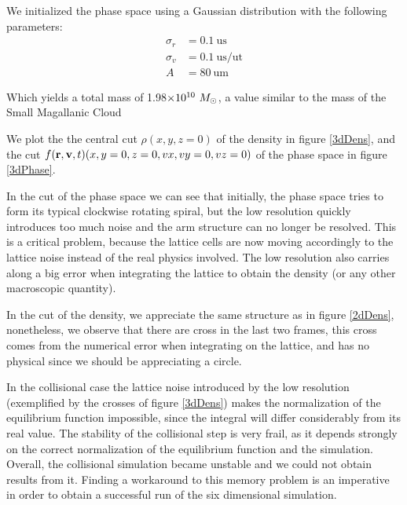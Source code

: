 {We initialized the phase space using a Gaussian distribution with the following parameters:
\begin{align}
\sigma_r &= 0.1 \ \text{us} \\
\sigma_v &= 0.1 \ \text{us} / \text{ut} \\
A &= 80  \ \text{um}
\end{align}

Which yields a total mass of 1.98$\e{10} \ M_{\odot}$, a value similar to the mass of the Small Magallanic Cloud \cite{2009MNRAS395342B}

We plot the the central cut $\rho(x,y,z=0)$ of the density in figure \ref{3dDens}, and the cut $\f(x,y=0,z=0,vx,vy=0,vz=0)$ of the phase space in figure \ref{3dPhase}. 

In the cut of the phase space we can see that initially, the phase space tries to form its typical clockwise rotating spiral, but the low resolution quickly introduces too much noise and the arm structure can no longer be resolved. This is a critical problem, because the lattice cells are now moving accordingly to the lattice noise instead of the real physics involved. The low resolution also carries along a big error when integrating the lattice to obtain the density (or any other macroscopic quantity).

In the cut of the density, we appreciate the same structure as in figure \ref{2dDens}, nonetheless, we observe that there are cross in the last two frames, this cross comes from the numerical error when integrating on the lattice, and has no physical since we should be appreciating a circle. 

In the collisional case the lattice noise introduced by the low resolution (exemplified by the crosses of figure \ref{3dDens}) makes the normalization of the equilibrium function impossible, since the integral will differ considerably from its real value. The stability of the collisional step is very frail, as it depends strongly on the correct normalization of the equilibrium function and the simulation. Overall, the collisional simulation became unstable and we could not obtain results from it. Finding a workaround to this memory problem is an imperative in order to obtain a successful run of the six dimensional simulation. 

}
